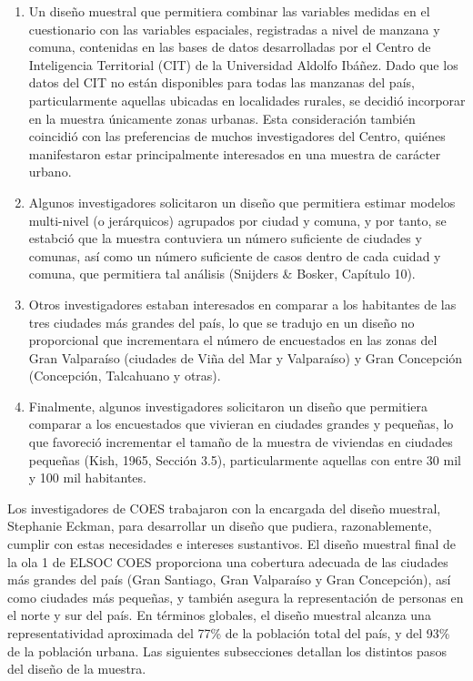 \documentclass[
  12pt,
]{article}
\begin{document}
\begin{enumerate}
\def\labelenumi{\arabic{enumi}.}
\item
  Un diseño muestral que permitiera combinar las variables medidas en el cuestionario con las variables espaciales, registradas a nivel de manzana y comuna, contenidas en las bases de datos desarrolladas por el Centro de Inteligencia Territorial (CIT) de la Universidad Aldolfo Ibáñez. Dado que los datos del CIT no están disponibles para todas las manzanas del país, particularmente aquellas ubicadas en localidades rurales, se decidió incorporar en la muestra únicamente zonas urbanas. Esta consideración también coincidió con las preferencias de muchos investigadores del Centro, quiénes manifestaron estar principalmente interesados en una muestra de carácter urbano.
\item
  Algunos investigadores solicitaron un diseño que permitiera estimar modelos multi-nivel (o jerárquicos) agrupados por ciudad y comuna, y por tanto, se estabció que la muestra contuviera un número suficiente de ciudades y comunas, así como un número suficiente de casos dentro de cada cuidad y comuna, que permitiera tal análisis (Snijders \& Bosker, Capítulo 10).
\item
  Otros investigadores estaban interesados en comparar a los habitantes de las tres ciudades más grandes del país, lo que se tradujo en un diseño no proporcional que incrementara el número de encuestados en las zonas del Gran Valparaíso (ciudades de Viña del Mar y Valparaíso) y Gran Concepción (Concepción, Talcahuano y otras).
\item
  Finalmente, algunos investigadores solicitaron un diseño que permitiera comparar a los encuestados que vivieran en ciudades grandes y pequeñas, lo que favoreció incrementar el tamaño de la muestra de viviendas en ciudades pequeñas (Kish, 1965, Sección 3.5), particularmente aquellas con entre 30 mil y 100 mil habitantes.
\end{enumerate}

Los investigadores de COES trabajaron con la encargada del diseño muestral, Stephanie Eckman, para desarrollar un diseño que pudiera, razonablemente, cumplir con estas necesidades e intereses sustantivos. El diseño muestral final de la ola 1 de ELSOC COES proporciona una cobertura adecuada de las ciudades más grandes del país (Gran Santiago, Gran Valparaíso y Gran Concepción), así como ciudades más pequeñas, y también asegura la representación de personas en el norte y sur del país. En términos globales, el diseño muestral alcanza una representatividad aproximada del 77\% de la población total del país, y del 93\% de la población urbana. Las siguientes subsecciones detallan los distintos pasos del diseño de la muestra.
\end{document}

